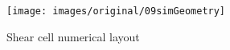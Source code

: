 \begin{figure}[!htb] 
\centering 
\texttt{[image: images/original/09simGeometry]} 
\caption{Shear cell numerical layout}
\label{fig:09simGeometry} 
\end{figure}


